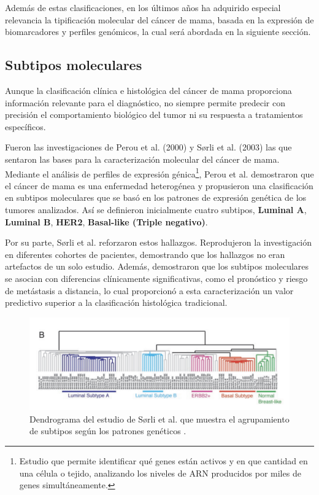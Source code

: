 \documentclass[a4paper,10pt]{book}
\begin{document}
Además de estas clasificaciones, en los últimos años ha adquirido especial relevancia la tipificación molecular del cáncer de mama, basada en la expresión de biomarcadores y perfiles genómicos, la cual será abordada en la siguiente sección.


\subsection{Subtipos moleculares}

Aunque la clasificación clínica e histológica del cáncer de mama proporciona información relevante para el diagnóstico, no siempre permite predecir con precisión el comportamiento biológico del tumor ni su respuesta a tratamientos específicos. 

Fueron las investigaciones de Perou et al. (2000) \cite{perou_molecular_2000} y Sørli et al. (2003) \cite{sorlie_repeated_2003} las que sentaron las bases para la caracterización molecular del cáncer de mama. Mediante el análisis de perfiles de expresión génica\footnote{Estudio que permite identificar qué genes están activos y en que cantidad en una célula o tejido, analizando los niveles de ARN producidos por miles de genes simultáneamente.}, Perou et al. demostraron que el cáncer de mama es una enfermedad heterogénea y propusieron una clasificación en subtipos moleculares que se basó en los patrones de expresión genética de los tumores analizados. Así se definieron inicialmente cuatro subtipos, \textbf{Luminal A}, \textbf{Luminal B}, \textbf{HER2}, \textbf{Basal-like (Triple negativo)}.

Por su parte, Sørli et al. reforzaron estos hallazgos. Reprodujeron la investigación en diferentes cohortes de pacientes, demostrando que los hallazgos no eran artefactos de un solo estudio. Además, demostraron que los subtipos moleculares se asocian con diferencias clínicamente significativas, como el pronóstico y riesgo de metástasis a distancia, lo cual proporcionó a esta caracterización un valor predictivo superior a la clasificación histológica tradicional.

\begin{figure}
    \centering
    \includegraphics[width=0.8\linewidth]{reports//assets/dendogram.png}
    \caption{Dendrograma del estudio de Sørli et al. que muestra el agrupamiento de subtipos según los patrones genéticos \cite{sorlie_repeated_2003}.}
    \label{fig:sorlie-dandrogram}
\end{figure}
\end{document}
